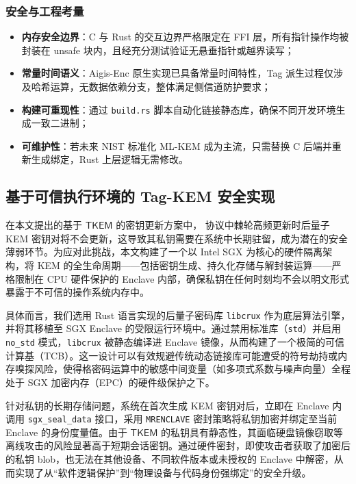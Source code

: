 \subsubsection{安全与工程考量}
\begin{itemize}
    \item \textbf{内存安全边界}：C 与 Rust 的交互边界严格限定在 FFI 层，所有指针操作均被封装在 unsafe 块内，且经充分测试验证无悬垂指针或越界读写；
    \item \textbf{常量时间语义}：Aigis-Enc 原生实现已具备常量时间特性，Tag 派生过程仅涉及哈希运算，无数据依赖分支，整体满足侧信道防护要求；
    \item \textbf{构建可重现性}：通过 \texttt{build.rs} 脚本自动化链接静态库，确保不同开发环境生成一致二进制；
    \item \textbf{可维护性}：若未来 NIST 标准化 ML-KEM 成为主流，只需替换 C 后端并重新生成绑定，Rust 上层逻辑无需修改。
\end{itemize}


\subsection{基于可信执行环境的 Tag-KEM 安全实现}
\label{sec:tee_implementation}

在本文提出的基于 $\mathsf{TKEM}$ 的密钥更新方案中， 协议中棘轮高频更新时后量子 KEM 密钥对将不会更新，这导致其私钥需要在系统中长期驻留，成为潜在的安全薄弱环节。为应对此挑战，本文构建了一个以 Intel SGX 为核心的硬件隔离架构，将 KEM 的全生命周期——包括密钥生成、持久化存储与解封装运算——严格限制在 CPU 硬件保护的 Enclave 内部，确保私钥在任何时刻均不会以明文形式暴露于不可信的操作系统内存中。

具体而言，我们选用 Rust 语言实现的后量子密码库 \texttt{libcrux} 作为底层算法引擎，并将其移植至 SGX Enclave 的受限运行环境中。通过禁用标准库（\texttt{std}）并启用 \texttt{no\_std} 模式，\texttt{libcrux} 被静态编译进 Enclave 镜像，从而构建了一个极简的可信计算基（TCB）。这一设计可以有效规避传统动态链接库可能遭受的符号劫持或内存嗅探风险，使得格密码运算中的敏感中间变量（如多项式系数与噪声向量）全程处于 SGX 加密内存（EPC）的硬件级保护之下。

针对私钥的长期存储问题，系统在首次生成 KEM 密钥对后，立即在 Enclave 内调用 \texttt{sgx\_seal\_data} 接口，采用 \texttt{MRENCLAVE} 密封策略将私钥加密并绑定至当前 Enclave 的身份度量值。由于 $\mathsf{TKEM}$ 的私钥具有静态性，其面临硬盘镜像窃取等离线攻击的风险显著高于短期会话密钥。通过硬件密封，即使攻击者获取了加密后的私钥 blob，也无法在其他设备、不同软件版本或未授权的 Enclave 中解密，从而实现了从“软件逻辑保护”到“物理设备与代码身份强绑定”的安全升级。

